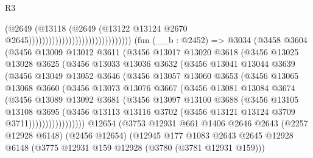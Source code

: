 \begin{lexlean}{R3}
\begin{coremodule}
                                                          (@2649
                                                            (@13118
                                                              (@2649
                                                                (@13122
                                                                  @13124
                                                                  @2670
                                                                  @2645)))))))))))))))))))))))))))))))
    (fun (__b : @2452) =>
    @3034
      (@3458
        @3604
        (@3456
          @13009
          @13012
          @3611
          (@3456
            @13017
            @13020
            @3618
            (@3456
              @13025
              @13028
              @3625
              (@3456
                @13033
                @13036
                @3632
                (@3456
                  @13041
                  @13044
                  @3639
                  (@3456
                    @13049
                    @13052
                    @3646
                    (@3456
                      @13057
                      @13060
                      @3653
                      (@3456
                        @13065
                        @13068
                        @3660
                        (@3456
                          @13073
                          @13076
                          @3667
                          (@3456
                            @13081
                            @13084
                            @3674
                            (@3456
                              @13089
                              @13092
                              @3681
                              (@3456
                                @13097
                                @13100
                                @3688
                                (@3456
                                  @13105
                                  @13108
                                  @3695
                                  (@3456
                                    @13113
                                    @13116
                                    @3702
                                    (@3456 @13121 @13124 @3709 @3711)))))))))))))))))
    @12654
    (@3753
      @12931
      @661
      @1406
      @2646
      @2643
      (@2257 @12928 @6148)
      (@2456 @12654)
      (@12945
        @177
        @1083
        @2643
        @2645
        @12928
        @6148
        (@3775 @12931 @159 @12928 (@3780 (@3781 @12931 @159)))

\end{coremodule}
\end{lexlean}
